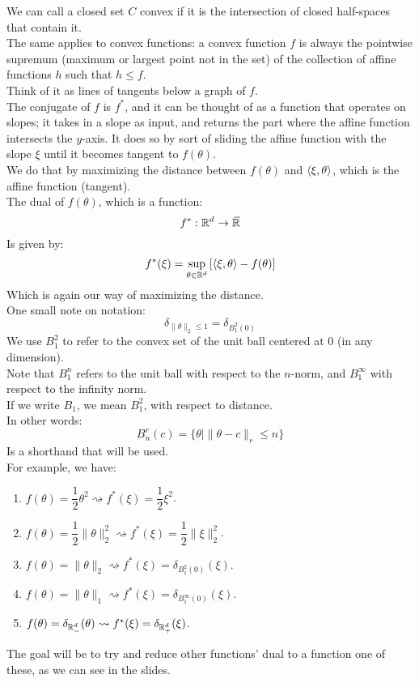 \documentclass[12pt]{article}
\begin{document}
We can call a closed set $C$
convex if it is the intersection of
closed half-spaces that contain it. \\

The same applies to convex functions:
a convex function $f$ is always the
pointwise supremum (maximum or largest
point not in the set) of the
collection of affine functions $h$
such that $h \leq f$. \\
Think of it as lines of tangents below a graph
of $f$. \\

The conjugate of $f$ is $f^*$,
and it can be thought of as a function that 
operates on slopes;
it takes in a slope as input, and returns
the part where the affine function
intersects the $y$-axis.
It does so by sort of sliding the affine
function with the slope $\xi$
until it becomes tangent to $f(\theta)$. \\
We do that by maximizing the distance
between $f(\theta)$
and $\left\langle \xi, \theta \right\rangle$, 
which is the affine function
(tangent). \\

The dual of $f(\theta)$,
which is a function:
\[ f^* : \mathbb{R}^d \to \,\overline{\!{\mathbb{R}}} \]
Is given by:
\[ f^*(\xi) = \sup_{\theta \in \mathbb{R}^d} 
\left[ \left\langle \xi, \theta \right\rangle - f(\theta) \right] \]
Which is again our way of maximizing
the distance. \\

One small note on notation:
\[ \delta_{\|\theta\|_2 \leq 1} = \delta_{B_1^2(0)} \]
We use $B_1^2$ to refer to the convex set of 
the unit ball centered at $0$ (in any dimension).\\
Note that $B_1^n$ refers to the unit ball with
respect to the $n$-norm, and $B_1^\infty$
with respect to the infinity norm. \\ 
If we write $B_1$, we mean $B_1^2$,
with respect to distance. \\

In other words:
\[ B_n^r(c) = \{ \theta \mid \| 
\theta - c \|_r \leq n \} \]
Is a shorthand that will be used. \\

For example, we have:
\begin{enumerate}
    \item $f(\theta) = \dfrac{1}{2}\theta^2
    \rightsquigarrow f^*(\xi) = \dfrac{1}{2}\xi^2$.
    \item $f(\theta) = \dfrac{1}{2}\|\theta\|_2^2
    \rightsquigarrow f^*(\xi) = \dfrac{1}{2}\|\xi\|_2^2$.
    \item $f(\theta) = \|\theta\|_2
    \rightsquigarrow f^*(\xi) = \delta_{B_1^2(0)}(\xi)$.
    \item $f(\theta) = \|\theta\|_1
    \rightsquigarrow f^*(\xi) = \delta_{B_1^\infty(0)}(\xi)$.
    \item $f(\theta) = \delta_{\mathbb{R}_-^d}(\theta)
    \rightsquigarrow f^*(\xi) = \delta_{\mathbb{R}_+^d}(\xi)$.
\end{enumerate}
The goal will be to try and reduce other
functions' dual to a function one of these,
as we can see in the slides. \\
\end{document}

